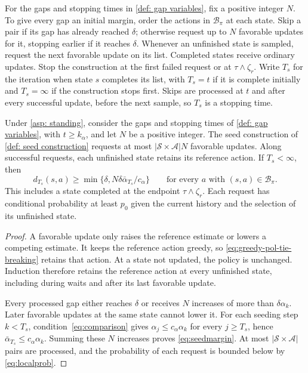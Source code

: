 \begin{definition}
\label{def: seed construction}
For the gaps and stopping times in \autoref{def: gap variables}, fix a positive integer $N$. To give every gap an initial margin, order the actions in $\mathcal B_\pi$ at each state. Skip a pair if its gap has already reached $\delta$; otherwise request up to $N$ favorable updates for it, stopping earlier if it reaches $\delta$. Whenever an unfinished state is sampled, request the next favorable update on its list. Completed states receive ordinary updates. Stop the construction at the first failed request or at $\tau\wedge\zeta_r$.
Write $T_s$ for the iteration when state $s$ completes its list, with $T_s=t$ if it is complete initially and $T_s=\infty$ if the construction stops first. Skips are processed at $t$ and after every successful update, before the next sample, so $T_s$ is a stopping time.
\end{definition}

\begin{lemma}[Seed]
\label{lem:seeds}
Under \autoref{asp: standing}, consider the gaps and stopping times of \autoref{def: gap variables}, with $t\ge k_\alpha$, and let $N$ be a positive integer. The seed construction of \autoref{def: seed construction} requests at most $|\mathcal S\times\mathcal A|N$ favorable updates. Along successful requests, each unfinished state retains its reference action. If $T_s<\infty$, then
\begin{equation}
\label{eq:seedmargin}
d_{T_s}(s,a)\ge\min\{\delta,N\delta\bar\alpha_{T_s}/c_\alpha\}
\qquad\text{for every }a\text{ with }(s,a)\in\mathcal B_\pi.
\end{equation}
This includes a state completed at the endpoint $\tau\wedge\zeta_r$. Each request has conditional probability at least $p_0$ given the current history and the selection of its unfinished state.
\end{lemma}
\begin{proof}
A favorable update only raises the reference estimate or lowers a competing estimate. It keeps the reference action greedy, so \eqref{eq:greedy-pol-tie-breaking} retains that action. At a state not updated, the policy is unchanged. Induction therefore retains the reference action at every unfinished state, including during waits and after its last favorable update.

Every processed gap either reaches $\delta$ or receives $N$ increases of more than $\delta\alpha_k$. Later favorable updates at the same state cannot lower it. For each seeding step $k<T_s$, condition~\eqref{eq:comparison} gives $\alpha_j\le c_\alpha\alpha_k$ for every $j\ge T_s$, hence $\bar\alpha_{T_s}\le c_\alpha\alpha_k$. Summing these $N$ increases proves \eqref{eq:seedmargin}.
At most $|\mathcal S\times\mathcal A|$ pairs are processed, and the probability of each request is bounded below by \eqref{eq:localprob}.
\end{proof}
